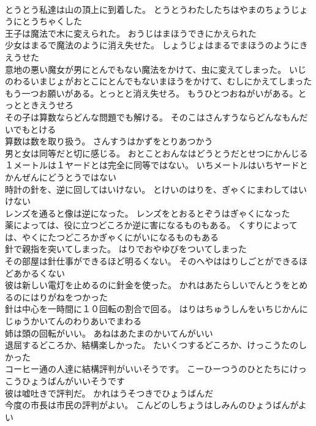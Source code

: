 \documentclass[8pt]{extreport}
\begin{document}
\begin{CJK}{UTF8}{min}
\\	とうとう私達は山の頂上に到着した。	とうとうわたしたちはやまのちょうじょうにとうちゃくした 
\\	王子は魔法で木に変えられた。	おうじはまほうできにかえられた 
\\	少女はまるで魔法のように消え失せた。	しょうじょはまるでまほうのようにきえうせた 
\\	意地の悪い魔女が男にとんでもない魔法をかけて、虫に変えてしまった。	いじのわるいまじょがおとこにとんでもないまほうをかけて、むしにかえてしまった 
\\	もう一つお願いがある。とっとと消え失せろ。	もうひとつおねがいがある。とっとときえうせろ 
\\	その子は算数ならどんな問題でも解ける。	そのこはさんすうならどんなもんだいでもとける 
\\	算数は数を取り扱う。	さんすうはかずをとりあつかう 
\\	男と女は同等だと切に感じる。	おとことおんなはどうとうだとせつにかんじる 
\\	１メートルは１ヤードとは完全に同等ではない。	いちメートルはいちヤードとかんぜんにどうとうではない 
\\	時計の針を、逆に回してはいけない。	とけいのはりを、ぎゃくにまわしてはいけない 
\\	レンズを通ると像は逆になった。	レンズをとおるとぞうはぎゃくになった 
\\	薬によっては、役に立つどころか逆に害になるものもある。	くすりによっては、やくにたつどころかぎゃくにがいになるものもある 
\\	針で親指を突いてしまった。	はりでおやゆびをついてしまった 
\\	その部屋は針仕事ができるほど明るくない。	そのへやははりしごとができるほどあかるくない 
\\	彼は新しい電灯を止めるのに針金を使った。	かれはあたらしいでんとうをとめるのにはりがねをつかった 
\\	針は中心を一時間に１０回転の割合で回る。	はりはちゅうしんをいちじかんにじゅうかいてんのわりあいでまわる 
\\	姉は頭の回転がいい。	あねはあたまのかいてんがいい 
\\	退屈するどころか、結構楽しかった。	たいくつするどころか、けっこうたのしかった 
\\	コーヒー通の人達に結構評判がいいそうです。	こーひーつうのひとたちにけっこうひょうばんがいいそうです 
\\	彼は嘘吐きで評判だ。	かれはうそつきでひょうばんだ 
\\	今度の市長は市民の評判がよい。	こんどのしちょうはしみんのひょうばんがよい 

\end{CJK}
\end{document}
